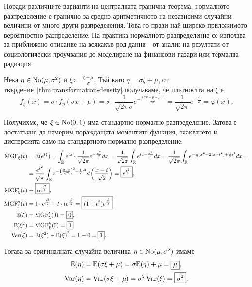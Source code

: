 \documentclass[numbers=endperiod, DIV=15, bibliography=totocnumbered]{scrartcl}
\begin{document}
Поради различните варианти на централната гранична теорема, нормалното разпределение е гранично за средно аритметичното на независими случайни величини от много други разпределения. Това го прави най-широко приложимото вероятностно разпределение. На практика нормалното разпределение се използва за приближено описание на всякакъв род данни - от анализ на резултати от социологически проучвания до моделиране на финансови пазари или термална радиация.

Нека $\eta \in \operatorname{No}(\mu, \sigma^2)$ и $\xi \coloneqq \frac {\xi - \mu} \sigma$. Тъй като $\eta = \sigma \xi + \mu$, от твърдение~\ref{thm:transformation-density} получаваме, че плътността на $\xi$ е
\begin{displaymath}
  f_\xi(x)
  =
  \sigma \cdot f_\eta(\sigma x + \mu)
  =
  \sigma \cdot \frac 1 {\sqrt{2\pi} \sigma} e^{-\frac{{(\sigma x + \mu -\mu)}^2} {2\sigma^2}}
  =
  \frac 1 {\sqrt{2\pi}} e^{-\frac {x^2} 2}
  =
  \varphi(x).
\end{displaymath}

Получихме, че $\xi \in \operatorname{No}(0, 1)$ има стандартно нормално разпределение. Затова е достатъчно да намерим пораждащата моментите функция, очакването и дисперсията само на стандартното нормално разпределение:
\begingroup
\allowdisplaybreaks
\begin{align*}
  \operatorname{MGF}_\xi(t)
  &=
  \mathbb{E}(e^{t\xi})
  =
  \int_{\mathbb{R}} e^{tx} \cdot \frac 1 {\sqrt{2\pi}} e^{-\frac {x^2} 2} dx
  =
  \frac 1 {\sqrt{2\pi}} \int_{\mathbb{R}} e^{tx -\frac {x^2} 2} dx
  =
  \frac 1 {\sqrt{2\pi}} \int_{\mathbb{R}} e^{- \frac 1 2 (x^2 - 2tx + t^2) + \frac 1 2 t^2} dx
  = \\ &=
  \frac {e^{t^2}} {\sqrt \pi} \int_{\mathbb{R}} e^{- {\left(\frac {x - t} {\sqrt 2} \right)}^2 + \frac 1 2 t^2} d\left( \frac {x - t} {\sqrt 2} \right)
  =
  \boxed{e^{\frac {t^2} 2}},
  \\
  \operatorname{MGF}'_\xi(t)
  &=
  \boxed{t e^{\frac {t^2} 2}},
  \\
  \operatorname{MGF}''_\xi(t)
  &=
  1 \cdot e^{\frac {t^2} 2} + t \cdot t e^{\frac {t^2} 2}
  =
  \boxed{(1 + t^2) e^{\frac {t^2} 2}}
  \\
  \mathbb{E}(\xi)
  &=
  \operatorname{MGF}'_\xi(0)
  =
  \boxed{0},
  \\
  \mathbb{E}(\xi^2)
  &=
  \operatorname{MGF}''_\xi(0)
  =
  \boxed{1}
  \\
  \operatorname{Var}(\xi)
  &=
  \mathbb{E}(\xi^2) - {\mathbb{E}(\xi)}^2
  =
  1 - 0
  =
  \boxed{1}.
\end{align*}
\endgroup

Тогава за оригиналната случайна величина $\eta \in \operatorname{No}(\mu, \sigma^2)$ имаме
\begin{align*}
  \mathbb{E}(\eta) &= \mathbb{E}(\sigma \xi + \mu) = \sigma \mathbb{E}(\eta) + \mu = \boxed{\mu}, \\
  \operatorname{Var}(\eta) &= \operatorname{Var}(\sigma \xi + \mu) = \sigma^2 \operatorname{Var}(\xi) = \boxed{\sigma^2}.
\end{align*}
\end{document}
